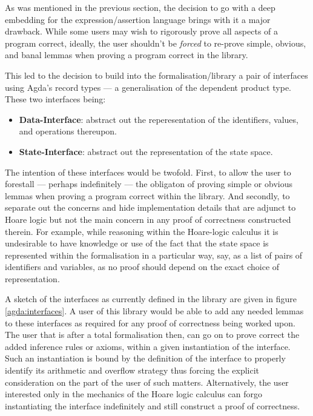 \documentclass[oneside,12pt]{article}
\begin{document}
As was mentioned in the previous section, the decision to go with a deep embedding for the expression/assertion language brings with it a major drawback. While some users may wish to rigorously prove all aspects of a program correct, ideally, the user shouldn't be \emph{forced} to re-prove simple, obvious, and banal lemmas when proving a program correct in the library.

This led to the decision to build into the formalisation/library a pair of interfaces using Agda's record types --- a generalisation of the dependent product type. These two interfaces being:


\begin{itemize}
\item \textbf{Data-Interface}: abstract out the reperesentation of the identifiers, values, and operations thereupon.
\item \textbf{State-Interface}: abstract out the representation of the state space.
\end{itemize}


The intention of these interfaces would be twofold. First, to allow the user to forestall --- perhaps indefinitely --- the obligaton of proving simple or obvious lemmas when proving a program correct within the library. And secondly, to separate out the concerns and hide implementation details that are adjunct to Hoare logic but not the main concern in any proof of correctness constructed therein. For example, while reasoning within the Hoare-logic calculus it is undesirable to have knowledge or use of the fact that the state space is represented within the formalisation in a particular way, say, as a list of pairs of identifiers and variables, as no proof should depend on the exact choice of representation.

A sketch of the interfaces as currently defined in the library are given in figure \ref{agda:interfaces}. A user of this library would be able to add any needed lemmas to these interfaces as required for any proof of correctness being worked upon. The user that is after a total formalisation then, can go on to prove correct the added inference rules or axioms, within a given instantiation of the interface. Such an instantiation is bound by the definition of the interface to properly identify its arithmetic and overflow strategy thus forcing the explicit consideration on the part of the user of such matters. Alternatively, the user interested only in the mechanics of the Hoare logic calculus can forgo instantiating the interface indefinitely and still construct a proof of correctness.
\end{document}
